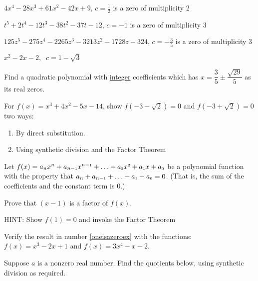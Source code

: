 \begin{exenum}

\item $4x^{4} - 28x^{3} + 61x^{2} - 42x + 9$, $c = \frac{1}{2}$ is a zero of multiplicity 2 

\item  $t^5+2t^4-12t^3-38t^2-37t-12$, $c=-1$ is a zero of multiplicity 3

\item $125z^{5} - 275z^{4} - 2265z^{3} - 3213z^{2} - 1728z - 324$, $c = -\frac{3}{5}$ is a zero of multiplicity 3

\item $x^{2} - 2x - 2, \;\; c = 1 - \sqrt{3}$ \label{factorpolyzerolast}

\item Find a quadratic polynomial with \underline{integer} coefficients which has $x = \dfrac{3}{5} \pm \dfrac{\sqrt{29}}{5}$ as its real zeros.

\item  \label{verifyrootsex}  For $f(x) = x^3 + 4x^2-5x-14$, show $f(-3-\sqrt{2}) = 0$ and $f(-3+\sqrt{2}) = 0$ two ways:

\begin{enumerate}

\item  By direct substitution.

\item  Using synthetic division and the Factor Theorem

\end{enumerate}

\item  \label{oneisazeroex} Let $f(x) = a_{n} x^{n} + a_{n-\mbox{\tiny$1$}} x^{n-\mbox{\tiny$1$}} + \ldots + a_{\mbox{\tiny $2$}} x^{\mbox{\tiny $2$}} + a_{\mbox{\tiny $1$}} x + a_{\mbox{\tiny $0$}}$ be a polynomial function with the property that $ a_{n}+a_{n-\mbox{\tiny$1$}} + \ldots + a_{\mbox{\tiny $1$}} + a_{\mbox{\tiny $0$}} = 0$.  (That is, the sum of the coefficients and the constant term is $0$.)  

Prove that $(x-1)$ is a factor of $f(x)$.

HINT:  Show $f(1) = 0$ and invoke the Factor Theorem

\item  Verify the result in number \ref{oneisazeroex} with the functions: $f(x) = x^3 - 2x + 1$ and  $f(x) = 3x^4-x-2$.

\item  \label{monomialdiffquotex} Suppose $a$ is a nonzero real number.  Find the quotients below, using synthetic division as required. 


\end{exenum}
